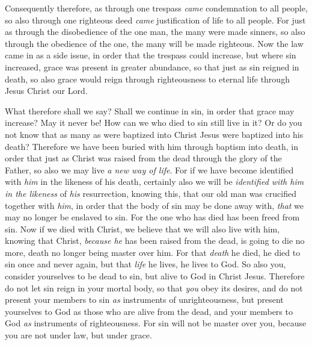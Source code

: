 \begin{biblechapter}
\verse Consequently therefore, as through one trespass \textit{came} condemnation to all people, so also through one righteous deed \textit{came} justification of life to all people.
\verse For just as through the disobedience of the one man, the many were made sinners, so also through the obedience of the one, the many will be made righteous.
\verse Now the law came in as a side issue, in order that the trespass could increase, but where sin increased, grace was present in greater abundance,
\verse so that just as sin reigned in death, so also grace would reign through righteousness to eternal life through Jesus Christ our Lord.
\end{biblechapter}

\begin{biblechapter} %
 What therefore shall we say? Shall we continue in sin, in order that grace may increase?
\verse May it never be! How can we who died to sin still live in it?
\verse Or do you not know that as many as were baptized into Christ Jesus were baptized into his death?
\verse Therefore we have been buried with him through baptism into death, in order that just as Christ was raised from the dead through the glory of the Father, so also we may live \textit{a new way of life}.
\verse For if we have become identified with \textit{him} in the likeness of his death, certainly also we will be \textit{identified with him in the likeness} of \textit{his} resurrection,
\verse knowing this, that our old man was crucified together with \textit{him}, in order that the body of sin may be done away with, \textit{that} we may no longer be enslaved to sin.
\verse For the one who has died has been freed from sin.
\verse Now if we died with Christ, we believe that we will also live with him,
\verse knowing that Christ, \textit{because he} has been raised from the dead, is going to die no more, death no longer being master over him.
\verse For that \textit{death} he died, he died to sin once and never again, but that \textit{life} he lives, he lives to God.
\verse So also you, consider yourselves to be dead to sin, but alive to God in Christ Jesus.
\verse Therefore do not let sin reign in your mortal body, so that \textit{you} obey its desires,
\verse and do not present your members to sin \textit{as} instruments of unrighteousness, but present yourselves to God as those who are alive from the dead, and your members to God \textit{as} instruments of righteousness.
\verse For sin will not be master over you, because you are not under law, but under grace.

\end{biblechapter}
